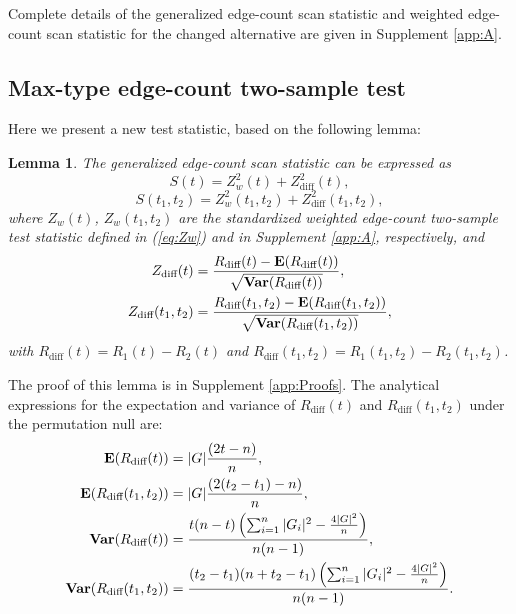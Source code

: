\documentclass[arxiv, preprint]{imsart}
\numberwithin{equation}{section}
\theoremstyle{plain}
\newtheorem{lemma}[thm]{Lemma}
\begin{document}
Complete details of the generalized edge-count scan statistic and weighted edge-count scan statistic for the changed alternative are given in Supplement \ref{app:A}. 

\subsection{Max-type edge-count two-sample test}
\label{sec:3.5}
Here we present a new test statistic, based on the following lemma: 
\begin{lemma}
\label{thm:S_finite} The generalized edge-count scan statistic can be expressed as 
\[S(t) = Z_w^2(t)+ Z_\text{diff}^2(t),\] 
\[S(t_1,t_2)=Z_w^2(t_1,t_2)+ Z_\text{diff}^2(t_1,t_2),\] where $Z_w(t)$, $Z_w(t_1,t_2)$ are the standardized weighted edge-count two-sample test statistic defined in (\ref{eq:Zw}) and in Supplement \ref{app:A}, respectively, and 
\begin{align} 
\label{eq:Zdiff} Z_\text{diff}(t) & = \frac{R_{\text{diff}}(t)- \mathbf{E}(R_{\text{diff}}(t))}{\sqrt{\text{\bf Var}(R_{\text{diff}}(t))} }, \\
\label{eq:Zdiff2} Z_\text{diff}(t_1,t_2) & = \frac{R_{\text{diff}}(t_1,t_2) - \mathbf{E}(R_{\text{diff}}(t_1,t_2))}{\sqrt{\text{\bf Var}(R_{\text{diff}}(t_1,t_2))}},
\end{align}
with $R_{\text{diff}}(t) = R_1(t)-R_2(t)$ and $R_{\text{diff}}(t_1,t_2) = R_1(t_1,t_2)-R_2(t_1,t_2)$.
\end{lemma}

The proof of this lemma is in Supplement \ref{app:Proofs}.  The analytical expressions for the expectation and variance of $R_{\text{diff}}(t)$ and $R_{\text{diff}}(t_1,t_2)$ under the permutation null are: 
\begin{align*}
 \mathbf{E}(R_\text{diff}(t)) & = |G|\frac{(2t-n)}{n}, \\
 \mathbf{E}(R_\text{diff}(t_1,t_2)) & =  |G| \frac{(2(t_2 - t_1)-n)}{n}, \\
  \text{\bf{Var}}(R_\text{diff}(t)) & = \frac{t(n-t)\left(\sum_{i=1}^n |G_i|^2 - \tfrac{4|G|^2}{n} \right)}{n(n-1)}, \\
 \text{\bf{Var}}(R_\text{diff}(t_1,t_2)) & = \frac{(t_2-t_1)(n+t_2-t_1)\left(\sum_{i=1}^n |G_i|^2 - \tfrac{4|G|^2}{n} \right)}{n(n-1)}.
\end{align*}
\end{document}
